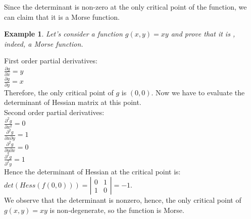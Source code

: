 \documentclass[]{article}
\newtheorem{example}{Example}
\begin{document}
Since the determinant is non-zero at the only critical point of the function, we can claim that it is a Morse function. \\
\begin{example}
Let's consider a function $g(x,y)=xy$ and prove that it is , indeed, a Morse function.\\ 

\end{example}
First order partial derivatives: \\
$\frac{\partial g}{\partial x}=y$\\
$\frac{\partial g}{\partial y}=x$\\
Therefore, the only critical point of $g$ is $(0,0)$. Now we have to evaluate the determinant of Hessian matrix at this point.\\
Second order partial derivatives: \\
$\frac{\partial^2 g}{\partial x^2}=0$\\
$\frac{\partial^2 g}{\partial x \partial y}=1$\\
$\frac{\partial^2 g}{\partial y \partial x}=0$\\
$\frac{\partial^2 g}{\partial^2 y}=1$\\
Hence the determinant of Hessian at the critical point is: \\
$det(Hess(f(0,0)))=\left| \begin{array}{cc} 0 & 1 \\ 1 & 0 \end{array} \right|=-1$. \\
We observe that the determinant is nonzero, hence, the only critical point of $g(x,y)=xy$ is non-degenerate, so the function is Morse. \\
\\
\\
\end{document}
